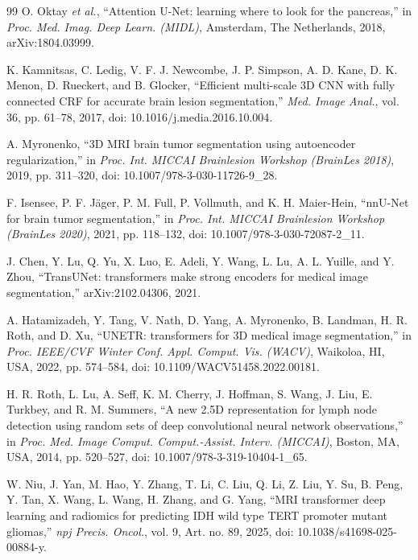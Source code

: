 \begin{thebibliography}{99}
O. Oktay \textit{et al.},
``Attention U-Net: learning where to look for the pancreas,''
in \textit{Proc. Med. Imag. Deep Learn. (MIDL)}, Amsterdam, The Netherlands, 2018, arXiv:1804.03999.

K. Kamnitsas, C. Ledig, V. F. J. Newcombe, J. P. Simpson, A. D. Kane, D. K. Menon, D. Rueckert, and B. Glocker,
``Efficient multi-scale 3D CNN with fully connected CRF for accurate brain lesion segmentation,''
\textit{Med. Image Anal.}, vol. 36, pp. 61--78, 2017, doi: 10.1016/j.media.2016.10.004.

A. Myronenko,
``3D MRI brain tumor segmentation using autoencoder regularization,''
in \textit{Proc. Int. MICCAI Brainlesion Workshop (BrainLes 2018)}, 2019, pp. 311--320, doi: 10.1007/978-3-030-11726-9\_28.

F. Isensee, P. F. J\"{a}ger, P. M. Full, P. Vollmuth, and K. H. Maier-Hein,
``nnU-Net for brain tumor segmentation,''
in \textit{Proc. Int. MICCAI Brainlesion Workshop (BrainLes 2020)}, 2021, pp. 118--132, doi: 10.1007/978-3-030-72087-2\_11.

J. Chen, Y. Lu, Q. Yu, X. Luo, E. Adeli, Y. Wang, L. Lu, A. L. Yuille, and Y. Zhou,
``TransUNet: transformers make strong encoders for medical image segmentation,''
arXiv:2102.04306, 2021.

A. Hatamizadeh, Y. Tang, V. Nath, D. Yang, A. Myronenko, B. Landman, H. R. Roth, and D. Xu,
``UNETR: transformers for 3D medical image segmentation,''
in \textit{Proc. IEEE/CVF Winter Conf. Appl. Comput. Vis. (WACV)},
Waikoloa, HI, USA, 2022, pp. 574--584, doi: 10.1109/WACV51458.2022.00181.

H. R. Roth, L. Lu, A. Seff, K. M. Cherry, J. Hoffman, S. Wang, J. Liu, E. Turkbey, and R. M. Summers,
``A new 2.5D representation for lymph node detection using random sets of deep convolutional neural network observations,''
in \textit{Proc. Med. Image Comput. Comput.-Assist. Interv. (MICCAI)}, Boston, MA, USA, 2014, pp. 520--527, doi: 10.1007/978-3-319-10404-1\_65.

W. Niu, J. Yan, M. Hao, Y. Zhang, T. Li, C. Liu, Q. Li, Z. Liu, Y. Su, B. Peng, Y. Tan, X. Wang, L. Wang, H. Zhang, and G. Yang,
``MRI transformer deep learning and radiomics for predicting IDH wild type TERT promoter mutant gliomas,''
\textit{npj Precis. Oncol.}, vol. 9, Art. no. 89, 2025, doi: 10.1038/s41698-025-00884-y.


\end{thebibliography}
